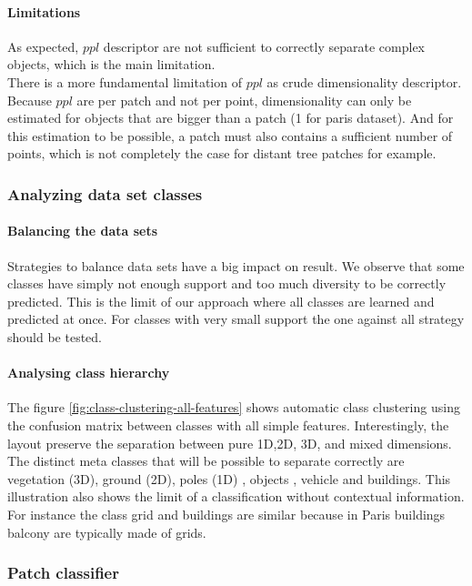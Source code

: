 			 \paragraph{Limitations}
				 
				 As expected, $ppl$ descriptor are  not sufficient to correctly separate complex objects, which is the main limitation.
				 \\
				 There is a more fundamental limitation of $ppl$ as crude dimensionality descriptor. Because $ppl$ are per patch and not per point, dimensionality can only be estimated for objects that are bigger than a patch (1 \cubic \meter for paris dataset).
				 And for this estimation to be possible, a patch must also contains a sufficient number of points, which is not completely the case for distant tree patches for example.
			 
			 
		 \subsubsection{Analyzing data set classes}
			 \paragraph{Balancing the data sets}
				 Strategies to balance data sets have a big impact on result. We observe that some classes have simply not enough support and too much diversity to be correctly predicted.
				 This is the limit of our approach where all classes are learned and predicted at once. For classes with very small support the one against all strategy should be tested. 
				 
			 \paragraph{Analysing class hierarchy}
				 The figure \ref{fig:class-clustering-all-features} shows automatic class clustering using the confusion matrix between classes with all simple features.
				 Interestingly, the layout preserve the separation between pure 1D,2D, 3D, and mixed dimensions.
				 The distinct meta classes that will be possible to separate correctly are vegetation (3D), ground (2D), poles (1D) , objects , vehicle and buildings.
				 This illustration also shows the limit of a classification without contextual information. For instance the class grid and buildings are similar because in Paris buildings balcony are typically made of grids.
				 
		 \subsubsection{Patch classifier}
